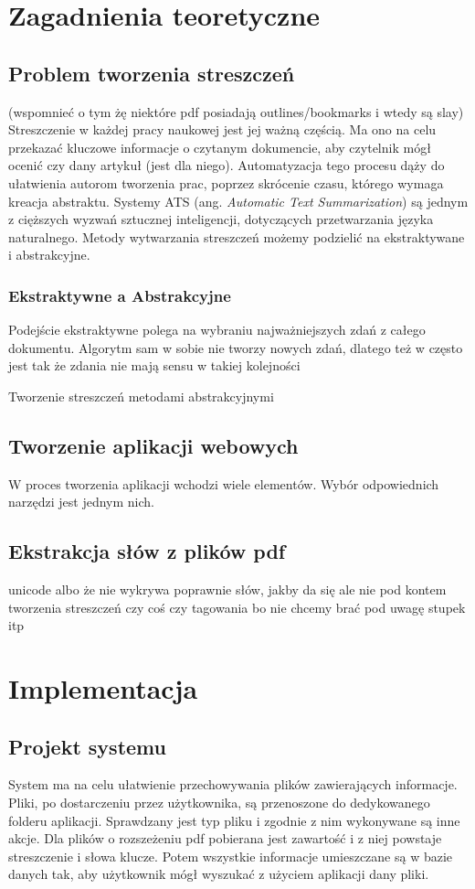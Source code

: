 \documentclass[12pt,a4paper,twoside]{article}
\begin{document}
\section{Zagadnienia teoretyczne}
\subsection{Problem tworzenia streszczeń}
(wspomnieć o tym żę niektóre pdf posiadają outlines/bookmarks i wtedy są slay)
Streszczenie w każdej pracy naukowej jest jej ważną częścią. Ma ono na celu przekazać kluczowe informacje o czytanym dokumencie, aby czytelnik mógł ocenić czy dany artykuł (jest dla niego). Automatyzacja tego procesu dąży do ułatwienia autorom tworzenia prac, poprzez skrócenie czasu, którego wymaga kreacja abstraktu. Systemy ATS (ang. \textit{Automatic Text Summarization}) są jednym z cięższych wyzwań sztucznej inteligencji, dotyczących przetwarzania języka naturalnego. Metody wytwarzania streszczeń możemy podzielić na ekstraktywane i abstrakcyjne.
\subsubsection*{Ekstraktywne a Abstrakcyjne}
Podejście ekstraktywne polega na wybraniu najważniejszych zdań z całego dokumentu. Algorytm sam w sobie nie tworzy nowych zdań, dlatego też w często jest tak że zdania nie mają sensu w takiej kolejności\par
Tworzenie streszczeń metodami abstrakcyjnymi 
\newpage
\subsection{Tworzenie aplikacji webowych}
W proces tworzenia aplikacji wchodzi wiele elementów. Wybór odpowiednich narzędzi jest jednym nich. 
\subsection{Ekstrakcja słów z plików pdf}
unicode  albo że nie wykrywa poprawnie słów, jakby da się ale nie pod kontem tworzenia streszczeń czy coś czy tagowania bo nie chcemy brać pod uwagę stupek itp
\section{Implementacja}
\subsection{Projekt systemu}
System ma na celu ułatwienie przechowywania plików zawierających informacje. Pliki, po dostarczeniu przez użytkownika, są przenoszone do dedykowanego folderu aplikacji. Sprawdzany jest typ pliku i zgodnie z nim wykonywane są inne akcje. Dla plików o rozszeżeniu pdf pobierana jest zawartość i z niej powstaje streszczenie i słowa klucze. Potem wszystkie informacje umieszczane są w bazie danych tak, aby użytkownik mógł wyszukać z użyciem aplikacji dany pliki. \par
\end{document}
